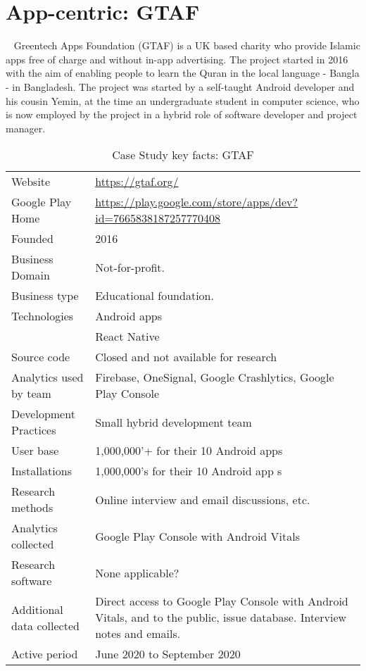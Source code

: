 \clearpage





\section{App-centric: GTAF}~\label{case-study-overview-gtaf}
Greentech Apps Foundation (GTAF) is a UK based charity who provide Islamic apps free of charge and without in-app advertising. The project started in 2016 with the aim of enabling people to learn the Quran in the local language - Bangla - in Bangladesh. The project was started by a self-taught Android developer and his cousin Yemin, at the time an undergraduate student in computer science, who is now employed by the project in a hybrid role of software developer and project manager. 

{\renewcommand{\arraystretch}{0.8}%
\begin{table}[htbp!]
    \centering
    \small
    \setlength{\tabcolsep}{1pt}
    \begin{tabular}{lp{11cm}}
       \toprule
       Website &\url{https://gtaf.org/} \\
       Google Play Home & \url{https://play.google.com/store/apps/dev?id=7665838187257770408} \\
       Founded & 2016 \\
       Business Domain & Not-for-profit.  \\
       Business type & Educational foundation. \\
       Technologies  & Android apps\footnotemark \\
       & React Native \\
       Source code  & Closed and not available for research \\
       Analytics used by team & Firebase, OneSignal, Google Crashlytics, Google Play Console \\
       Development Practices & Small hybrid development team \\
       \midrule
       User base & 1,000,000'+ for their 10 Android apps \\
       Installations & 1,000,000's for their 10 Android app s\\
       \midrule
       Research methods &Online interview and email discussions, etc. \\
       Analytics collected &Google Play Console with Android Vitals \\
       Research software & None applicable? \\
       Additional data collected &Direct access to Google Play Console with Android Vitals, and to the public, issue database. Interview notes and emails. \\
       Active period & June 2020 to September 2020 \\
       \bottomrule
    \end{tabular}
    \caption{Case Study key facts: GTAF}
    \label{tab:blank_case_study_anaytics_overview}
\end{table}
}

